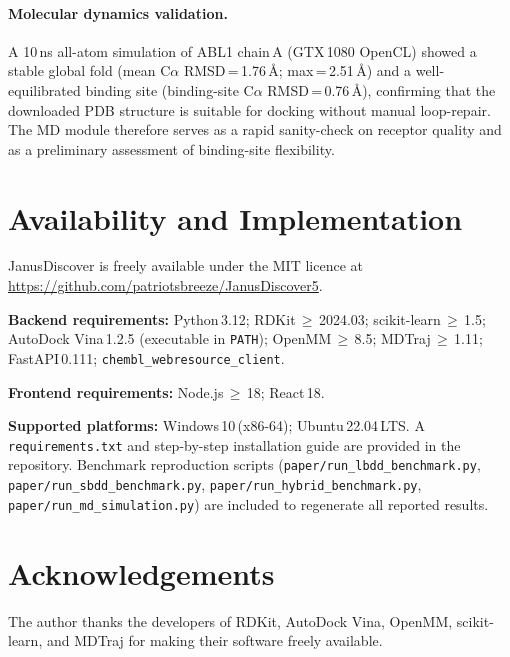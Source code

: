 \documentclass[12pt,a4paper]{article}
\begin{document}
\paragraph{Molecular dynamics validation.}
A 10\,ns all-atom simulation of ABL1 chain\,A (GTX\,1080 OpenCL) showed a
stable global fold (mean C$\alpha$ RMSD\,=\,1.76\,\AA;
max\,=\,2.51\,\AA) and a well-equilibrated binding site (binding-site
C$\alpha$ RMSD\,=\,0.76\,\AA), confirming that the downloaded PDB
structure is suitable for docking without manual loop-repair.  The MD
module therefore serves as a rapid sanity-check on receptor quality and
as a preliminary assessment of binding-site flexibility.

\section*{Availability and Implementation}

JanusDiscover is freely available under the MIT licence at\\
\url{https://github.com/patriotsbreeze/JanusDiscover5}.

\medskip\noindent
\textbf{Backend requirements:} Python\,3.12; RDKit\,$\geq$\,2024.03;
scikit-learn\,$\geq$\,1.5; AutoDock Vina\,1.2.5 (executable in
\texttt{PATH}); OpenMM\,$\geq$\,8.5; MDTraj\,$\geq$\,1.11;
FastAPI\,0.111; \texttt{chembl\_webresource\_client}.

\medskip\noindent
\textbf{Frontend requirements:} Node.js\,$\geq$\,18; React\,18.

\medskip\noindent
\textbf{Supported platforms:} Windows\,10\,(x86-64); Ubuntu\,22.04\,LTS.
A \texttt{requirements.txt} and step-by-step installation guide are
provided in the repository.  Benchmark reproduction scripts
(\texttt{paper/run\_lbdd\_benchmark.py},
\texttt{paper/run\_sbdd\_benchmark.py},
\texttt{paper/run\_hybrid\_benchmark.py},
\texttt{paper/run\_md\_simulation.py}) are included to regenerate all
reported results.

\section*{Acknowledgements}

The author thanks the developers of RDKit, AutoDock Vina, OpenMM, scikit-learn,
and MDTraj for making their software freely available.
\end{document}
